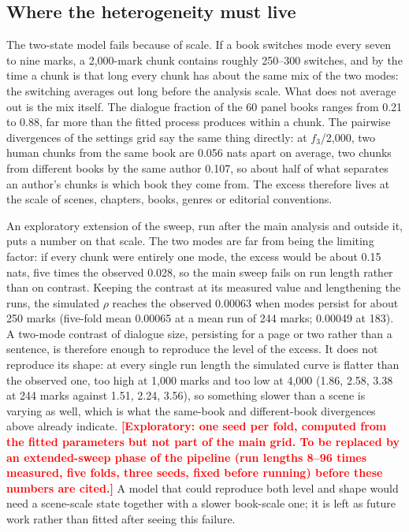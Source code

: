 \documentclass[11pt]{article}
\newcommand{\fThree}{\ensuremath{f_3}\xspace}
\newcommand{\placeholder}[1]{\textcolor{red}{\textbf{[#1]}}}
\begin{document}
\subsection{Where the heterogeneity must live}

The two-state model fails because of scale.  If a book switches mode every
seven to nine marks, a 2,000-mark chunk contains roughly 250--300
switches, and by the time a chunk is that long every chunk has about the
same mix of the two modes: the switching averages out long before the
analysis scale.  What does not average out is the mix itself.  The
dialogue fraction of the 60 panel books ranges from 0.21 to 0.88, far more
than the fitted process produces within a chunk.  The pairwise divergences
of the settings grid say the same thing directly: at \fThree/2,000, two
human chunks from the same book are 0.056 nats apart on average, two
chunks from different books by the same author 0.107, so about half of
what separates an author's chunks is which book they come from.  The
excess therefore lives at the scale of scenes, chapters, books, genres or
editorial conventions.

An exploratory extension of the sweep, run after the main analysis and
outside it, puts a number on that scale.  The two modes are far from
being the limiting factor: if every chunk were entirely one mode, the
excess would be about 0.15 nats, five times the observed 0.028, so the
main sweep fails on run length rather than on contrast.  Keeping the
contrast at its measured value and lengthening the runs, the simulated
\(\rho\) reaches the observed 0.00063 when modes persist for about 250
marks (five-fold mean 0.00065 at a mean run of 244 marks; 0.00049 at
183).  A two-mode contrast of dialogue size, persisting for a page or two
rather than a sentence, is therefore enough to reproduce the level of the
excess.  It does not reproduce its shape: at every single run length the
simulated curve is flatter than the observed one, too high at 1,000 marks
and too low at 4,000 (1.86, 2.58, 3.38 at 244 marks against 1.51, 2.24,
3.56), so something slower than a scene is varying as well, which is what
the same-book and different-book divergences above already indicate.
\placeholder{Exploratory: one seed per fold, computed from the fitted
parameters but not part of the main grid.  To be replaced by an
extended-sweep phase of the pipeline (run lengths 8--96 times measured,
five folds, three seeds, fixed before running) before these numbers are
cited.}  A model that could reproduce both level and shape would need a
scene-scale state together with a slower book-scale one; it is left as
future work rather than fitted after seeing this failure.
\end{document}
